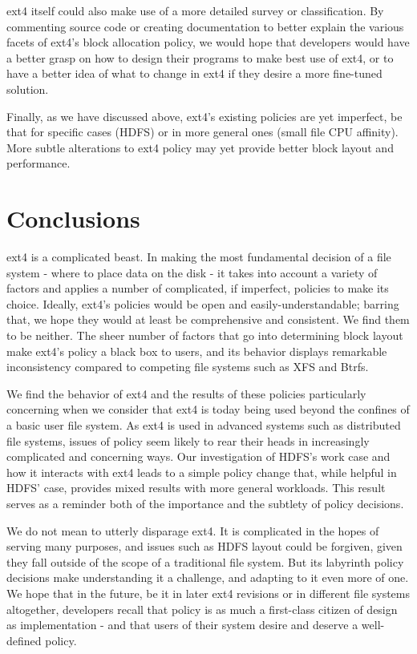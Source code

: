\documentclass{acm_proc_article-sp}
\begin{document}
ext4 itself could also make use of a more detailed survey or classification.  By commenting source code or creating documentation to better explain the various facets of ext4's block allocation policy, we would hope that developers would have a better grasp on how to design their programs to make best use of ext4, or to have a better idea of what to change in ext4 if they desire a more fine-tuned solution.
 
Finally, as we have discussed above, ext4's existing policies are yet imperfect, be that for specific cases (HDFS) or in more general ones (small file CPU affinity).  More subtle alterations to ext4 policy may yet provide better block layout and performance.

\section{Conclusions}
\label{sec:Conclusions}
ext4 is a complicated beast.  In making the most fundamental decision of a file system - where to place data on the disk - it takes into account a variety of factors and applies a number of complicated, if imperfect, policies to make its choice.  Ideally, ext4's policies would be open and easily-understandable; barring that, we hope they would at least be comprehensive and consistent.  We find them to be neither.  The sheer number of factors that go into determining block layout make ext4's policy a black box to users, and its behavior displays remarkable inconsistency compared to competing file systems such as XFS and Btrfs.
 
We find the behavior of ext4 and the results of these policies particularly concerning when we consider that ext4 is today being used beyond the confines of a basic user file system.  As ext4 is used in advanced systems such as distributed file systems, issues of policy seem likely to rear their heads in increasingly complicated and concerning ways.  Our investigation of HDFS's work case and how it interacts with ext4 leads to a simple policy change that, while helpful in HDFS' case, provides mixed results with more general workloads.  This result serves as a reminder both of the importance and the subtlety of policy decisions.
 
We do not mean to utterly disparage ext4.  It is complicated in the hopes of serving many purposes, and issues such as HDFS layout could be forgiven, given they fall outside of the scope of a traditional file system.  But its labyrinth policy decisions make understanding it a challenge, and adapting to it even more of one.  We hope that in the future, be it in later ext4 revisions or in different file systems altogether, developers recall that policy is as much a first-class citizen of design as implementation - and that users of their system desire and deserve a well-defined policy.
\end{document}
